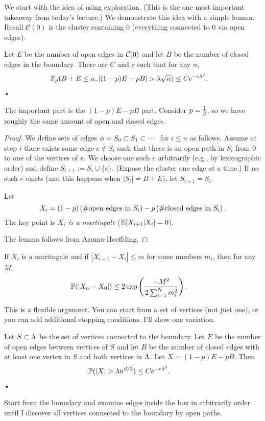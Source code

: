 We start with the idea of using exploration. (This is the one most important takeaway from today's lecture.) We demonstrate this idea with a simple lemma. Recall $\mathscr C(0)$ is the cluster containing 0 (everything connected to 0 via open edges).
\begin{lem}
Let $E$ be the number of open edges in $\mathcal{C}(0)$ and let $B$ be the number of closed edges in the boundary. There are $C$ and $c$ such that for any $n$,
\begin{align*}
\Pj_p (B+E\le n, |(1-p)E-pB|> \la \sqrt n) &\le Ce^{-c\la^2}.
\end{align*}•
\end{lem}
The important part is the $(1-p)E-pB$ part. Consider $p=\frac{1}{2}$, so we have roughly the same amount of open and closed edges.
\begin{proof}
We define sets of edges $\phi = S_0\subset S_1\subset \cdots$ for $i\le n$ as follows. Assume at step $i$ there exists some edge $e\nin S_i$ such that there is an open path in $S_i$ from 0 to one of the vertices of $e$.
We choose one such $e$ arbitrarily (e.g., by lexicographic order) and define $S_{i+1}:=S_i\cup \{e\}$. (Expose the cluster one edge at a time.) If no such $e$ exists (and this happens when $|S_i|=B+E$), let $S_{i+1}=S_i$.

Let 
$$X_i = (1-p)\left( \text{\#open edges in $S_i$} \right) - p\left( \text{\#closed edges in $S_i$} \right).$$
The key point is \emph{$X_i$ is a martingale} ($\mathbb{E}[X_{i+1}|X_i]=0$). 

The lemma follows from Azuma-Hoeffding.
\end{proof}
\begin{thm}
If $X_i$ is a martingale and if $|X_{i+1}-X_i|\le m$ for some numbers $m_i$, then for any $M$,
\begin{align*}
\mathbb{P}(|X_n-X_0|) &\le 2\exp\left( {\frac{-M^2}{2\sum_{i=1}^{N} m_i^2}} \right).
\end{align*}
\end{thm}

This is a flexible argument. You can start from a set of vertices (not just one), or you can add additional stopping conditions.
I'll show one variation.
\begin{lem}
Let $S\subset \Lambda$ be the set of vertices connected to the boundary. Let $E$ be the number of open edges between vertices of $S$ and let $B$ be the number of closed edges with at least one vertex in $S$ and both vertices in $\Lambda$. Let $X=(1-p)E-pB$. Then
\begin{align*}
\Pj(|X|>\la n^{d/2}) &\le Ce^{-c\la^2}.
\end{align*}•
\end{lem}
Start from the boundary and examine edges inside the box in arbitrarily order until I discover all vertices connected to the boundary by open paths.

